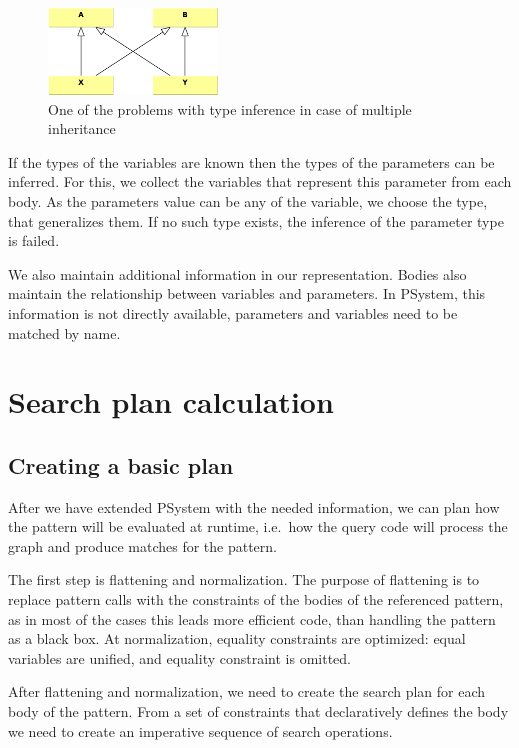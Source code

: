 \begin{figure}[h]
	\begin{center}
		\includegraphics[width=0.4\textwidth]{figures/multiple-inheritance-problem.pdf}
		\caption{One of the problems with type inference in case of multiple inheritance}
		\label{fig:multiple-inheritance-problem}
	\end{center}
\end{figure}

If the types of the variables are known then the types of the parameters can be inferred. 
For this, we collect the variables that represent this parameter from each body.
As the parameters value can be any of the variable, we choose the type, that generalizes them.
If no such type exists, the inference of the parameter type is failed.

We also maintain additional information in our representation. 
Bodies also maintain the relationship between variables and parameters. 
In PSystem, this information is not directly available, parameters and variables need to be matched by name.

\section{Search plan calculation}

\subsection{Creating a basic plan}
After we have extended PSystem with the needed information, we can plan how the pattern will be evaluated at runtime, i.e.\ how the query code will process the graph and produce matches for the pattern.

The first step is flattening and normalization. 
The purpose of flattening is to replace pattern calls with the constraints of the bodies of the referenced pattern, as in most of the cases this leads more efficient code, than handling the pattern as a black box.
At normalization, equality constraints are optimized: equal variables are unified, and equality constraint is omitted.

After flattening and normalization, we need to create the search plan for each body of the pattern. From a set of constraints that declaratively defines the body we need to create an imperative sequence of search operations.

